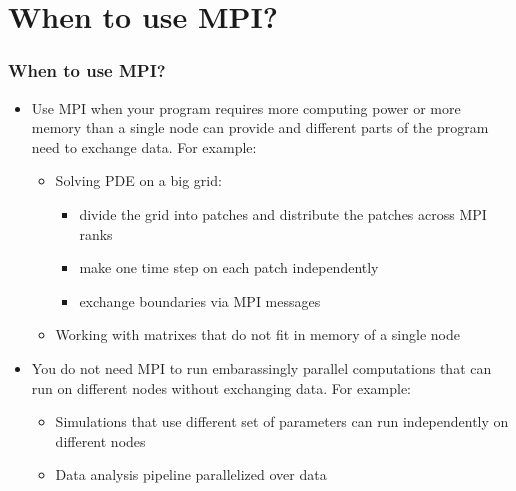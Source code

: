 \documentclass{beamer}
\begin{document}
\section{When to use MPI?}
\begin{frame}[fragile]
  \frametitle{When to use MPI?}
  \begin{itemize}
    \item Use MPI when your program requires more computing power or more memory than a single node can provide and different parts of the program need to exchange data. For example:
      \begin{itemize}
        \item Solving PDE on a big grid: 
          \begin{itemize}
          \item divide the grid into patches and distribute the patches across MPI ranks
          \item make one time step on each patch independently
          \item exchange boundaries via MPI messages
          \end{itemize}
        \item Working with matrixes that do not fit in memory of a single node
      \end{itemize}
    \item You do not need MPI to run embarassingly parallel computations that can run on different nodes without exchanging data. For example:
      \begin{itemize}
      \item Simulations that use different set of parameters can run independently on different nodes
      \item Data analysis pipeline parallelized over data
      \end{itemize}
  \end{itemize}
\end{frame}
\end{document}
